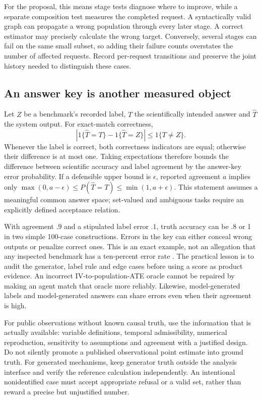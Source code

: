 For the proposal, this means stage tests diagnose where to improve, while a
separate composition test measures the completed request. A syntactically
valid graph can propagate a wrong population through every later stage. A
correct estimator may precisely calculate the wrong target. Conversely,
several stages can fail on the same small subset, so adding their failure
counts overstates the number of affected requests. Record per-request
transitions and preserve the joint history needed to distinguish these cases.

\subsection{An answer key is another measured object}

Let $Z$ be a benchmark's recorded label, $T$ the scientifically intended answer
and $\widehat T$ the system output. For exact-match correctness,
\begin{equation}
 \left|1\{\widehat T=T\}-1\{\widehat T=Z\}\right|
 \leq1\{T\ne Z\}.
 \label{exec13:frontier-oracle}
\end{equation}
Whenever the label is correct, both correctness indicators are equal;
otherwise their difference is at most one. Taking expectations therefore
bounds the difference between scientific accuracy and label agreement by the
answer-key error probability. If a defensible upper bound is $\epsilon$,
reported agreement $a$ implies only
$\max(0,a-\epsilon)\leq P(\widehat T=T)\leq\min(1,a+\epsilon)$.
This statement assumes a meaningful common answer space; set-valued and
ambiguous tasks require an explicitly defined acceptance relation.

With agreement $.9$ and a stipulated label error $.1$, truth accuracy can be
$.8$ or 1 in two simple 100-case constructions. Errors in the key can either
conceal wrong outputs or penalize correct ones. This is an exact example, not
an allegation that any inspected benchmark has a ten-percent error rate
\citep{exec13_frontier_exact}. The practical lesson is to audit the generator,
label rule and edge cases before using a score as product evidence. An
incorrect IV-to-population-ATE oracle cannot be repaired by making an agent
match that oracle more reliably. Likewise, model-generated labels and
model-generated answers can share errors even when their agreement is high.

For public observations without known causal truth, use the information that
is actually available: variable definitions, temporal admissibility, numerical
reproduction, sensitivity to assumptions and agreement with a justified design.
Do not silently promote a published observational point estimate into ground
truth. For generated mechanisms, keep generator truth outside the analysis
interface and verify the reference calculation independently. An intentional
nonidentified case must accept appropriate refusal or a valid set, rather than
reward a precise but unjustified number.

